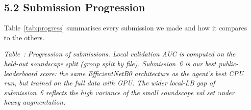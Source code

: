 \documentclass[11pt,a4paper]{article}
\begin{document}
\subsection*{5.2 Submission Progression}

Table~\ref{tab:progress} summarises every submission we made and how it compares to the others.

\begin{center}
\end{center}
\label{tab:progress}
\textit{Table~\thetable: Progression of submissions. Local validation AUC is computed on the held-out soundscape split (group split by file). Submission~6 is our best public-leaderboard score: the same EfficientNetB0 architecture as the agent's best CPU run, but trained on the full data with GPU. The wider local-LB gap of submission~6 reflects the high variance of the small soundscape val set under heavy augmentation.}

\vspace{0.6em}
\end{document}
